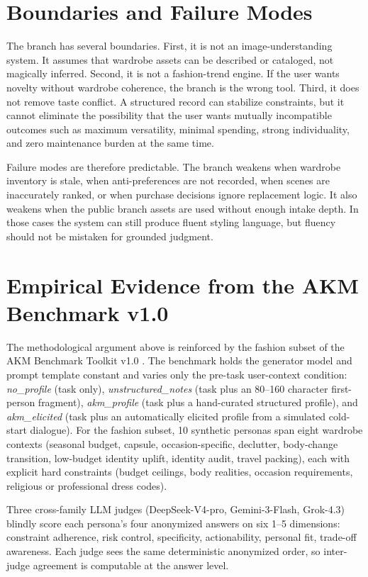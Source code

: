 \documentclass[11pt]{article}
\begin{document}
\section{Boundaries and Failure Modes}

The branch has several boundaries. First, it is not an image-understanding system. It assumes that wardrobe assets can be described or cataloged, not magically inferred. Second, it is not a fashion-trend engine. If the user wants novelty without wardrobe coherence, the branch is the wrong tool. Third, it does not remove taste conflict. A structured record can stabilize constraints, but it cannot eliminate the possibility that the user wants mutually incompatible outcomes such as maximum versatility, minimal spending, strong individuality, and zero maintenance burden at the same time.

Failure modes are therefore predictable. The branch weakens when wardrobe inventory is stale, when anti-preferences are not recorded, when scenes are inaccurately ranked, or when purchase decisions ignore replacement logic. It also weakens when the public branch assets are used without enough intake depth. In those cases the system can still produce fluent styling language, but fluency should not be mistaken for grounded judgment.

\section{Empirical Evidence from the AKM Benchmark v1.0}
\label{sec:empirical}

The methodological argument above is reinforced by the fashion subset of the AKM Benchmark Toolkit v1.0 \citep{shao2026akm}. The benchmark holds the generator model and prompt template constant and varies only the pre-task user-context condition: \textit{no\_profile} (task only), \textit{unstructured\_notes} (task plus an 80--160 character first-person fragment), \textit{akm\_profile} (task plus a hand-curated structured profile), and \textit{akm\_elicited} (task plus an automatically elicited profile from a simulated cold-start dialogue). For the fashion subset, 10 synthetic personas span eight wardrobe contexts (seasonal budget, capsule, occasion-specific, declutter, body-change transition, low-budget identity uplift, identity audit, travel packing), each with explicit hard constraints (budget ceilings, body realities, occasion requirements, religious or professional dress codes).

Three cross-family LLM judges (DeepSeek-V4-pro, Gemini-3-Flash, Grok-4.3) blindly score each persona's four anonymized answers on six 1--5 dimensions: constraint adherence, risk control, specificity, actionability, personal fit, trade-off awareness. Each judge sees the same deterministic anonymized order, so inter-judge agreement is computable at the answer level.
\end{document}
